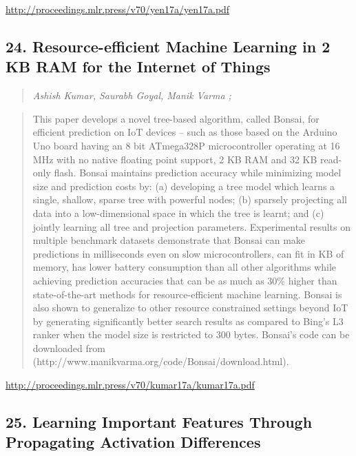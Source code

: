 \documentclass{article}
\begin{document}
\href{http://proceedings.mlr.press/v70/yen17a/yen17a.pdf}{http://proceedings.mlr.press/v70/yen17a/yen17a.pdf}

\subsection{24. Resource-efficient Machine Learning in 2 KB RAM for the Internet of Things}

\begin{quote}
\footnotesize{\textit{Ashish Kumar, Saurabh Goyal, Manik Varma ;}}

\end{quote}

\begin{quote}
    This paper develops a novel tree-based algorithm, called Bonsai, for efficient prediction on IoT devices – such as those based on the Arduino Uno board having an 8 bit ATmega328P microcontroller operating at 16 MHz with no native floating point support, 2 KB RAM and 32 KB read-only flash. Bonsai maintains prediction accuracy while minimizing model size and prediction costs by: (a) developing a tree model which learns a single, shallow, sparse tree with powerful nodes; (b) sparsely projecting all data into a low-dimensional space in which the tree is learnt; and (c) jointly learning all tree and projection parameters. Experimental results on multiple benchmark datasets demonstrate that Bonsai can make predictions in milliseconds even on slow microcontrollers, can fit in KB of memory, has lower battery consumption than all other algorithms while achieving prediction accuracies that can be as much as 30\% higher than state-of-the-art methods for resource-efficient machine learning. Bonsai is also shown to generalize to other resource constrained settings beyond IoT by generating significantly better search results as compared to Bing’s L3 ranker when the model size is restricted to 300 bytes. Bonsai’s code can be downloaded from (http://www.manikvarma.org/code/Bonsai/download.html).  
\end{quote}

\href{http://proceedings.mlr.press/v70/kumar17a/kumar17a.pdf}{http://proceedings.mlr.press/v70/kumar17a/kumar17a.pdf}

\subsection{25. Learning Important Features Through Propagating Activation Differences}
\end{document}
